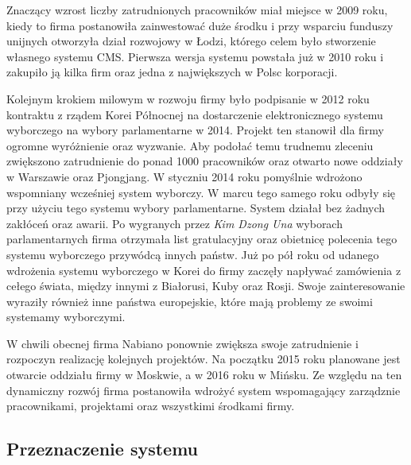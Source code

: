 Znaczący wzrost liczby zatrudnionych pracowników miał miejsce w 2009
roku, kiedy to firma postanowiła zainwestować duże środku i przy
wsparciu funduszy unijnych otworzyła dział rozwojowy w Łodzi, którego celem
było stworzenie własnego systemu CMS. Pierwsza wersja systemu powstała
już w 2010 roku i zakupiło ją kilka firm oraz jedna z największych w
Polsc korporacji.

Kolejnym krokiem milowym w rozwoju firmy było podpisanie w 2012 roku
kontraktu z rządem Korei Północnej na dostarczenie elektronicznego
systemu wyborczego na wybory parlamentarne w 2014. Projekt ten
stanowił dla firmy ogromne wyróżnienie oraz wyzwanie. Aby podołać temu
trudnemu zleceniu zwiększono zatrudnienie do ponad 1000 pracowników
oraz otwarto nowe oddziały w Warszawie oraz Pjongjang. W styczniu 2014
roku pomyślnie wdrożono wspomniany wcześniej system wyborczy. W marcu
tego samego roku odbyły się przy użyciu tego systemu wybory
parlamentarne. System działał bez żadnych zakłóceń oraz awarii. Po
wygranych przez {\it Kim Dzong Una} wyborach parlamentarnych firma
otrzymała list gratulacyjny oraz obietnicę polecenia tego systemu
wyborczego przywódcą innych państw. Już po pół roku od udanego
wdrożenia systemu wyborczego w Korei do firmy zaczęły napływać
zamówienia z cełego świata, między innymi z Białorusi, Kuby oraz
Rosji. Swoje zainteresowanie wyraziły również inne państwa
europejskie, które mają problemy ze swoimi systemamy wyborczymi.

W chwili obecnej firma Nabiano ponownie zwiększa swoje zatrudnienie i
rozpoczyn realizację kolejnych projektów. Na początku 2015 roku
planowane jest otwarcie oddziału firmy w Moskwie, a w 2016 roku w
Mińsku. Ze względu na ten dynamiczny rozwój firma postanowiła wdrożyć
system wspomagający zarządznie pracownikami, projektami oraz
wszystkimi środkami firmy.

\subsection{Przeznaczenie systemu}

